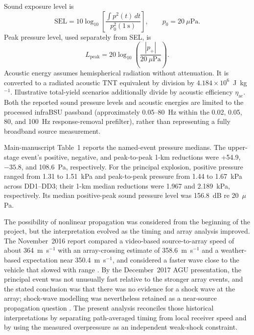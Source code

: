 \documentclass[]{seismica}
\begin{document}
Sound exposure level is
\begin{equation}
 \mathrm{SEL}=10\log_{10}\left[
 \frac{\int p^2(t)\,dt}{p_0^2(1~\mathrm{s})}\right],
 \qquad p_0=20~\mu\mathrm{Pa}.
\end{equation}
Peak pressure level, used separately from SEL, is
\begin{equation}
 L_{\mathrm{peak}}=20\log_{10}\left(\frac{|p_+|}{20~\mu\mathrm{Pa}}\right).
\end{equation}
Acoustic energy assumes hemispherical radiation without attenuation. It is
converted to a radiated acoustic TNT equivalent by division by
$4.184\times10^6$~J~kg$^{-1}$. Illustrative total-yield scenarios additionally
divide by acoustic efficiency $\eta_{\mathrm{ac}}$. Both the reported sound
pressure levels and acoustic energies are limited to the processed infraBSU
passband (approximately 0.05--80~Hz within the 0.02, 0.05, 80, and 100~Hz
response-removal prefilter), rather than representing a fully broadband source
measurement.

Main-manuscript Table~1 reports the named-event pressure medians. The
upper-stage event's positive, negative, and peak-to-peak 1-km reductions were
+54.9, $-35.8$, and 108.6~Pa, respectively. For the principal explosion,
positive pressure ranged from 1.31 to 1.51~kPa and peak-to-peak pressure from
1.44 to 1.67~kPa across DD1--DD3; their 1-km median reductions were 1.967 and
2.189~kPa, respectively. Its median positive-peak sound pressure level was
156.8~dB re 20~$\mu$Pa.

The possibility of nonlinear propagation was considered from the beginning
of the project, but the interpretation evolved as the timing and array
analysis improved. The November~2016 report compared a video-based
source-to-array speed of about 364~m~s$^{-1}$ with an array-crossing estimate
of 358.6~m~s$^{-1}$ and a weather-based expectation near 350.4~m~s$^{-1}$,
and considered a faster wave close to the vehicle that slowed with range
\citep{thompson_mcnutt_fireball_2016}. By the December~2017 AGU presentation,
the principal event was not unusually fast relative to the stronger array
events, and the stated conclusion was that there was no evidence for a shock
wave at the array; shock-wave modelling was nevertheless retained as a
near-source propagation question \citep{thompson_agu_falcon9_2017}. The
present analysis reconciles those historical interpretations by separating
path-averaged timing from local receiver speed and by using the measured
overpressure as an independent weak-shock constraint.
\end{document}
